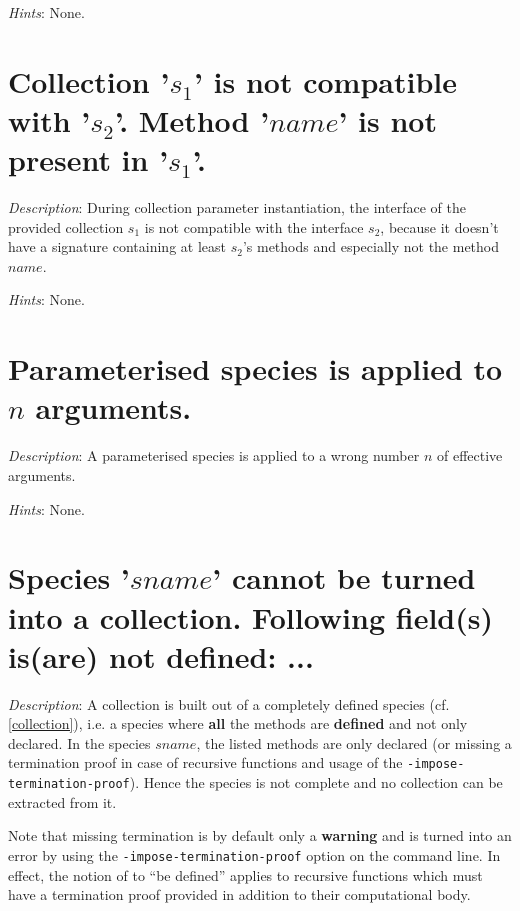 {\em Hints}: None.



\section*{Collection  '$s_1$' is not compatible with  '$s_2$'.  Method '$name$'
  is not present in '$s_1$'.}

{\em Description}: During collection parameter instantiation, the interface
of the provided collection $s_1$ is not compatible with the interface $s_2$,
because it doesn't have a signature containing at least $s_2$'s methods and
especially not the method $name$.

{\em Hints}: None.



\section*{Parameterised species is applied to $n$ arguments.}

{\em Description}: A parameterised species is applied to a wrong
number $n$ of effective arguments.

{\em Hints}: None.



\section*{Species '$sname$' cannot be turned into a collection. Following
 field(s) is(are) not defined: ...}

{\em Description}: A collection is built  out of a  completely defined species
(cf. \ref{collection}), i.e. a species where {\bf all} the methods
are {\bf defined} and not only declared. In the species $sname$, the
listed methods are only declared (or missing a termination proof in case of
recursive functions and usage of the {\tt -impose-termination-proof}).
Hence the species is not complete and no collection can be extracted
from it.

Note that missing termination is by default only a {\bf warning} and
is turned into an error by using the {\tt -impose-termination-proof}
option on the command line. In effect, the notion of to ``be defined''
applies to recursive functions which must have a termination proof
provided in addition to their computational body.


